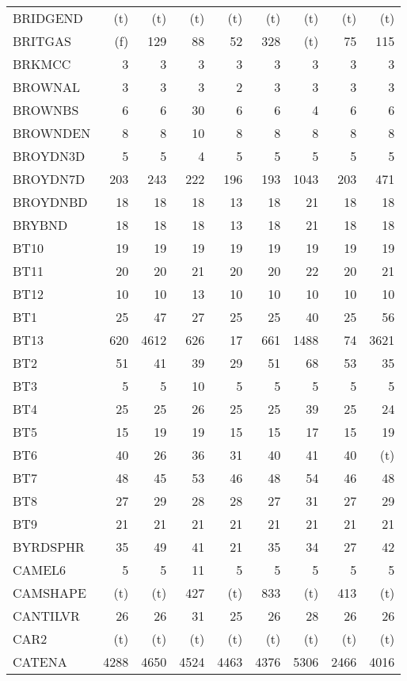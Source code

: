 \documentclass[11pt,twoside]{article}
\begin{document}
{\begin{longtable}[c]{|l|r|r|r|r|r|r|r|r|}
 BRIDGEND & (t) & (t) & (t) & (t) & (t) & (t) & (t) & (t) \\
 BRITGAS & (f) & 129 & 88 & 52 & 328 & (t) & 75 & 115 \\
 BRKMCC & 3 & 3 & 3 & 3 & 3 & 3 & 3 & 3 \\
 BROWNAL & 3 & 3 & 3 & 2 & 3 & 3 & 3 & 3 \\
 BROWNBS & 6 & 6 & 30 & 6 & 6 & 4 & 6 & 6 \\
 BROWNDEN & 8 & 8 & 10 & 8 & 8 & 8 & 8 & 8 \\
 BROYDN3D & 5 & 5 & 4 & 5 & 5 & 5 & 5 & 5 \\
 BROYDN7D & 203 & 243 & 222 & 196 & 193 & 1043 & 203 & 471 \\
 BROYDNBD & 18 & 18 & 18 & 13 & 18 & 21 & 18 & 18 \\
 BRYBND & 18 & 18 & 18 & 13 & 18 & 21 & 18 & 18 \\
 BT10 & 19 & 19 & 19 & 19 & 19 & 19 & 19 & 19 \\
 BT11 & 20 & 20 & 21 & 20 & 20 & 22 & 20 & 21 \\
 BT12 & 10 & 10 & 13 & 10 & 10 & 10 & 10 & 10 \\
 BT1 & 25 & 47 & 27 & 25 & 25 & 40 & 25 & 56 \\
 BT13 & 620 & 4612 & 626 & 17 & 661 & 1488 & 74 & 3621 \\
 BT2 & 51 & 41 & 39 & 29 & 51 & 68 & 53 & 35 \\
 BT3 & 5 & 5 & 10 & 5 & 5 & 5 & 5 & 5 \\
 BT4 & 25 & 25 & 26 & 25 & 25 & 39 & 25 & 24 \\
 BT5 & 15 & 19 & 19 & 15 & 15 & 17 & 15 & 19 \\
 BT6 & 40 & 26 & 36 & 31 & 40 & 41 & 40 & (t) \\
 BT7 & 48 & 45 & 53 & 46 & 48 & 54 & 46 & 48 \\
 BT8 & 27 & 29 & 28 & 28 & 27 & 31 & 27 & 29 \\
 BT9 & 21 & 21 & 21 & 21 & 21 & 21 & 21 & 21 \\
 BYRDSPHR & 35 & 49 & 41 & 21 & 35 & 34 & 27 & 42 \\
 CAMEL6 & 5 & 5 & 11 & 5 & 5 & 5 & 5 & 5 \\
 CAMSHAPE & (t) & (t) & 427 & (t) & 833 & (t) & 413 & (t) \\
 CANTILVR & 26 & 26 & 31 & 25 & 26 & 28 & 26 & 26 \\
 CAR2 & (t) & (t) & (t) & (t) & (t) & (t) & (t) & (t) \\
 CATENA & 4288 & 4650 & 4524 & 4463 & 4376 & 5306 & 2466 & 4016 \\

\end{longtable}}
\end{document}
